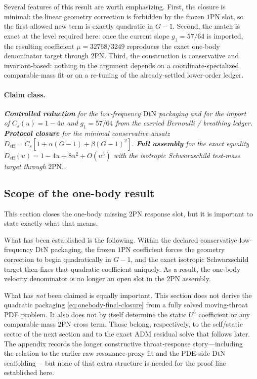 \documentclass[11pt]{article}
\newcommand{\OnePN}{\mathrm{1PN}}
\newcommand{\TwoPN}{\mathrm{2PN}}
\newcommand{\ADM}{\mathrm{ADM}}
\newcommand{\DtN}{\mathrm{DtN}}
\newcommand{\eff}{\mathrm{eff}}
\newcommand{\Controlled}{\textbf{Controlled reduction}}
\newcommand{\Protocol}{\textbf{Protocol closure}}
\newcommand{\FullMatch}{\textbf{Full assembly}}
\newcommand{\claimclass}[1]{\paragraph{Claim class.}\emph{#1.}}
\begin{document}
Several features of this result are worth emphasizing.  First, the closure is minimal:
the linear geometry correction is forbidden by the frozen \(\OnePN\) slot, so the first
allowed new term is exactly quadratic in \(G-1\).  Second, the match is exact at the
level required here: once the current slope \(g_1=57/64\) is imported, the resulting
coefficient \(\mu=32768/3249\) reproduces the exact one-body denominator target through
\(\TwoPN\).  Third, the construction is conservative and invariant-based: nothing in the
argument depends on a coordinate-specialized comparable-mass fit or on a re-tuning of the
already-settled lower-order ledger.

\claimclass{\Controlled{} for the low-frequency \(\DtN\) packaging and for the import of
\(C_s(u)=1-4u\) and \(g_1=57/64\) from the carried Bernoulli / breathing ledger.
\Protocol{} for the minimal conservative ansatz
\(D_{\eff}=C_s[1+\alpha(G-1)+\beta(G-1)^2]\).
\FullMatch{} for the exact equality
\(D_{\eff}(u)=1-4u+8u^2+O(u^3)\) with the isotropic Schwarzschild test-mass target
through \(\TwoPN\).}

\subsection{Scope of the one-body result}
\label{sec:one-body-status}

This section closes the one-body missing \(\TwoPN\) response slot, but it is important to
state exactly what that means.

What has been established is the following.  Within the declared conservative
low-frequency \(\DtN\) packaging, the frozen \(\OnePN\) coefficient forces the geometry
correction to begin quadratically in \(G-1\), and the exact isotropic Schwarzschild
target then fixes that quadratic coefficient uniquely.  As a result, the one-body
velocity denominator is no longer an open slot in the \(\TwoPN\) assembly.

What has \emph{not} been claimed is equally important.  This section does not derive the
quadratic packaging \cref{eq:onebody-final-closure} from a fully solved moving-throat PDE
problem.  It also does not by itself determine the static \(U^3\) coefficient or any
comparable-mass \(\TwoPN\) cross term.  Those belong, respectively, to the self/static
sector of the next section and to the exact \(\ADM\) residual solve that follows later.
The appendix records the longer constructive throat-response story---including the
relation to the earlier raw resonance-proxy fit and the PDE-side \(\DtN\) scaffolding---
but none of that extra structure is needed for the proof line established here.
\end{document}
